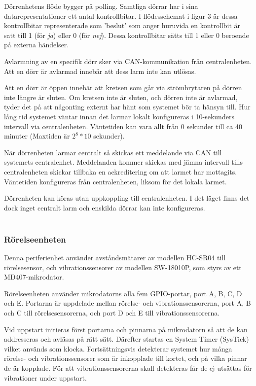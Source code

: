 \documentclass{article}
\begin{document}
Dörrenhetens flöde bygger på polling. Samtliga dörrar har i sina datarepresentationer ett antal kontrollbitar. I flödesschemat i figur 3 är dessa kontrollbitar representerade som 'beslut' som anger huruvida en kontrollbit är satt till 1 (för \textit{ja}) eller 0 (för \textit{nej}). Dessa kontrollbitar sätts till 1 eller 0 beroende på externa händelser.

Avlarmning av en specifik dörr sker via CAN-kommunikation från centralenheten. Att en dörr är avlarmad innebär att dess larm inte kan utlösas.

Att en dörr är öppen innebär att kretsen som går via strömbrytaren på dörren inte längre är sluten. Om kretsen inte är sluten, och dörren inte är avlarmad, tyder det på att någonting externt har hänt som systemet bör ta hänsyn till. Hur lång tid systemet väntar innan det larmar lokalt konfigureras i 10-sekunders intervall via centralenheten. Väntetiden kan vara allt från 0 sekunder till ca 40 minuter (Maxtiden är $2^8 *10$ sekunder).

När dörrenheten larmar centralt så skickas ett meddelande via CAN till systemets centralenhet. Meddelanden kommer skickas med jämna intervall tills centralenheten skickar tillbaka en ackreditering om att larmet har mottagits. Väntetiden konfigureras från centralenheten, liksom för det lokala larmet.

Dörrenheten kan köras utan uppkoppling till centralenheten. I det läget finns det dock inget centralt larm och enskilda dörrar kan inte konfigureras.\\ \\



\subsubsection{Rörelseenheten}
Denna periferienhet använder avståndsmätarer av modellen HC-SR04 till rörelsesensor,
 och vibrationssensorer av modellen SW-18010P, som styrs av ett MD407-mikrodator.

Rörelseenheten använder mikrodatorns alla fem GPIO-portar, port A, B, C, D och E. 
Portarna är uppdelade mellan rörelse- och vibrationssensorerna, port A, B och C till rörelsesensorerna, 
och port D och E till vibrationssensorerna.

Vid uppstart initieras först portarna och pinnarna på mikrodatorn så att de kan addresseras 
och avläsas på rätt sätt. Därefter startas en System Timer (SysTick) vilket används som klocka. 
Fortsättningsvis detekterar systemet hur många rörelse- och vibrationssensorer som är inkopplade till kortet, och på vilka 
pinnar de är kopplade. För att vibrationssensorerna skall detekteras får de ej utsättas för vibrationer under uppstart.
\end{document}
